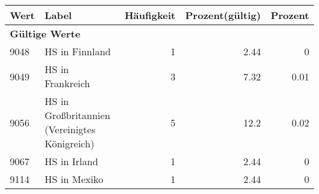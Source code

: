      \begin{longtable}{lXrrr}
     \toprule
     \textbf{Wert} & \textbf{Label} & \textbf{Häufigkeit} & \textbf{Prozent(gültig)} & \textbf{Prozent} \\
     \endhead
     \midrule
     \multicolumn{5}{l}{\textbf{Gültige Werte}}\\

     9048 &
     \multicolumn{1}{X}{ HS in Finnland   } &


       \num{1} &
       \num[round-mode=places,round-precision=2]{2,44} &
         \num[round-mode=places,round-precision=2]{0} \\

     9049 &
     \multicolumn{1}{X}{ HS in Frankreich   } &


       \num{3} &
       \num[round-mode=places,round-precision=2]{7,32} &
         \num[round-mode=places,round-precision=2]{0,01} \\

     9056 &
     \multicolumn{1}{X}{ HS in Großbritannien (Vereinigtes Königreich)   } &


       \num{5} &
       \num[round-mode=places,round-precision=2]{12,2} &
         \num[round-mode=places,round-precision=2]{0,02} \\

     9067 &
     \multicolumn{1}{X}{ HS in Irland   } &


       \num{1} &
       \num[round-mode=places,round-precision=2]{2,44} &
         \num[round-mode=places,round-precision=2]{0} \\

     9114 &
     \multicolumn{1}{X}{ HS in Mexiko   } &


       \num{1} &
       \num[round-mode=places,round-precision=2]{2,44} &
         \num[round-mode=places,round-precision=2]{0} \\


\end{longtable}
